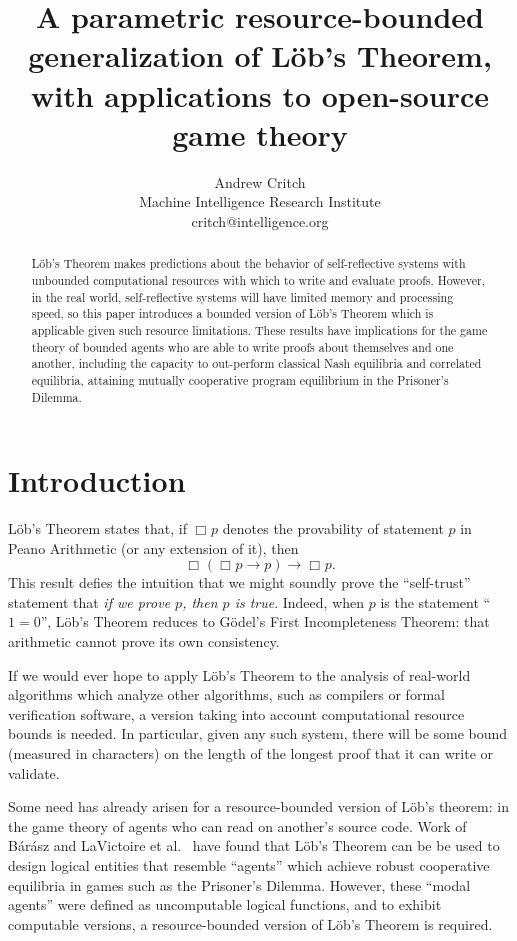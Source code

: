 \documentclass[onecolumn]{miri-tech-article}
\title{A parametric resource-bounded generalization of L\"{o}b's Theorem, with applications to open-source game theory}
\author{Andrew Critch \\ Machine Intelligence Research Institute \\ critch@intelligence.org}
\numberwithin{equation}{section}
\theoremstyle{definition}
\newcommand{\bx}[1]{\Box_{#1}}
\renewcommand{\implies}{\rightarrow}
\renewcommand{\-}{^{-1}}
\begin{document}
\publishingnote{}

\maketitle

\begin{abstract}
L\"{o}b's Theorem makes predictions about the behavior of self-reflective systems with unbounded computational resources with which to write and evaluate proofs.  However, in the real world, self-reflective systems will have limited memory and processing speed, so this paper introduces a bounded version of L\"{o}b's Theorem which is applicable given such resource limitations.  
These results have implications for the game theory of bounded agents who are able to write proofs about themselves and one another, including the capacity to out-perform classical Nash equilibria and correlated equilibria, attaining mutually cooperative program equilibrium in the Prisoner's Dilemma.
\end{abstract}

\section{Introduction}\label{sec:bo}

L\"{o}b's Theorem states that, if $\bx{}p$ denotes the provability of statement $p$ in Peano Arithmetic (or any extension of it), then 
\[
\bx{}(\bx{}p \implies p) \implies \bx{}p.
\]
This result defies the intuition that we might soundly prove the ``self-trust'' statement that {\em if we prove $p$, then $p$ is true}.  Indeed, when $p$ is the statement ``$1=0$'', L\"{o}b's Theorem reduces to G\"{o}del's First Incompleteness Theorem: that arithmetic cannot prove its own consistency.

If we would ever hope to apply L\"{o}b's Theorem to the analysis of real-world algorithms which analyze other algorithms, such as compilers or formal verification software, a version taking into account computational resource bounds is needed.  In particular, given any such system, there will be some bound (measured in characters) on the length of the longest proof that it can write or validate.

Some need has already arisen for a resource-bounded version of L\"{o}b's theorem: in the game theory of agents who can read on another's source code.  Work of B\'{a}r\'{a}sz and LaVictoire et al.~\cite{Barasz:2014:RobustCooperation}\cite{LaVictoire:2014:PrisDilemmaLob} have found that L\"{o}b's Theorem can be be used to design logical entities that resemble ``agents'' which achieve robust cooperative equilibria in games such as the Prisoner's Dilemma.  However, these ``modal agents'' were defined as uncomputable logical functions, and to exhibit computable versions, a resource-bounded version of L\"{o}b's Theorem is required.
\end{document}
